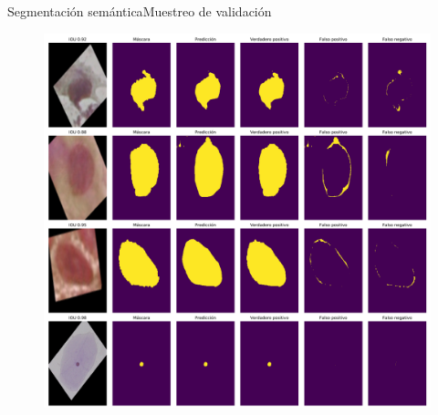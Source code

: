 \documentclass{beamer}
\begin{document}
    \begin{frame}{Segmentación semántica}{Muestreo de validación}
        \begin{figure}[]
            \centering
            \includegraphics[height=0.95\textheight]{muestreo_mascaras_segmentacion}
        \end{figure}
    \end{frame}



\end{document}
